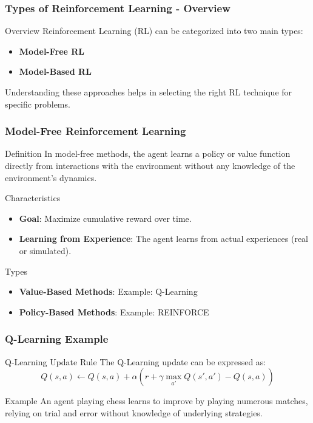\documentclass[aspectratio=169]{beamer}
\begin{document}
\begin{frame}[fragile]
    \frametitle{Types of Reinforcement Learning - Overview}
    \begin{block}{Overview}
        Reinforcement Learning (RL) can be categorized into two main types:
        \begin{itemize}
            \item \textbf{Model-Free RL}
            \item \textbf{Model-Based RL}
        \end{itemize}
        Understanding these approaches helps in selecting the right RL technique for specific problems.
    \end{block}
\end{frame}

\begin{frame}[fragile]
    \frametitle{Model-Free Reinforcement Learning}
    \begin{block}{Definition}
        In model-free methods, the agent learns a policy or value function directly from interactions with the environment without any knowledge of the environment's dynamics.
    \end{block}
    
    \begin{block}{Characteristics}
        \begin{itemize}
            \item \textbf{Goal}: Maximize cumulative reward over time.
            \item \textbf{Learning from Experience}: The agent learns from actual experiences (real or simulated).
        \end{itemize}
    \end{block}

    \begin{block}{Types}
        \begin{itemize}
            \item \textbf{Value-Based Methods}: Example: Q-Learning
            \item \textbf{Policy-Based Methods}: Example: REINFORCE
        \end{itemize}
    \end{block}
\end{frame}

\begin{frame}[fragile]
    \frametitle{Q-Learning Example}
    \begin{block}{Q-Learning Update Rule}
        The Q-Learning update can be expressed as:
        \begin{equation}
            Q(s, a) \leftarrow Q(s, a) + \alpha \left( r + \gamma \max_{a'} Q(s', a') - Q(s, a) \right)
        \end{equation}
    \end{block}

    \begin{block}{Example}
        An agent playing chess learns to improve by playing numerous matches, relying on trial and error without knowledge of underlying strategies.
    \end{block}
\end{frame}
\end{document}
